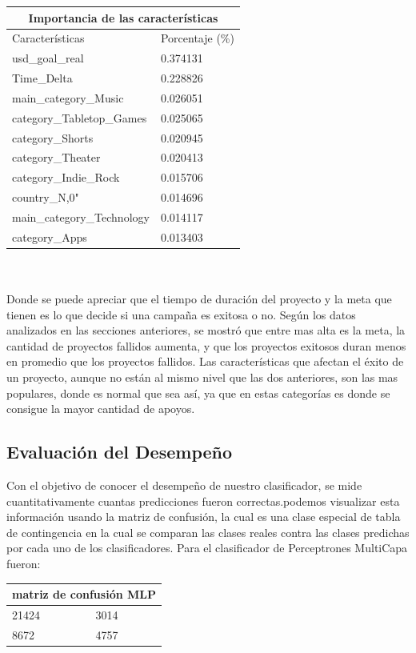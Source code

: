 \documentclass[journal]{IEEEtran}
\begin{document}
\begin{tabular}{ ||p{4cm}||p{3cm}|| }
 \hline
 \multicolumn{2}{|c|}{Importancia de las características} \\
 \hline
 Características & Porcentaje (\%) \\
 \hline
 usd\_goal\_real    & 0.374131 \\
 Time\_Delta       &  0.228826\\
 main\_category\_Music & 0.026051\\
 category\_Tabletop\_Games & 0.025065\\
 category\_Shorts &  0.020945\\
 category\_Theater &  0.020413\\
 category\_Indie\_Rock  & 0.015706\\
 country\_N,0" & 0.014696 \\
 main\_category\_Technology & 0.014117 \\
 category\_Apps & 0.013403 \\

 \hline
\end{tabular}\\
\\

Donde se puede apreciar que el tiempo de duración del proyecto y la meta que tienen es lo que decide si una campaña es exitosa o no. Según los datos analizados en las secciones anteriores, se mostró que entre mas alta es la meta, la cantidad de proyectos fallidos aumenta, y que los proyectos exitosos duran menos en promedio que los proyectos fallidos. Las características que afectan el éxito de un proyecto, aunque no están al mismo nivel que las dos anteriores, son las mas populares, donde es normal que sea así, ya que en estas categorías es donde se consigue la mayor cantidad de apoyos.
\subsection{Evaluación del Desempeño}
Con el objetivo de conocer el desempeño de nuestro clasificador, se mide cuantitativamente cuantas predicciones fueron correctas.podemos visualizar esta información usando la matriz de confusión, la cual es una clase especial de tabla de contingencia en la cual se comparan las clases reales contra las clases predichas por cada uno de los clasificadores. Para el clasificador de Perceptrones MultiCapa fueron:\\

\begin{tabular}{ ||p{3cm}||p{3cm}|| }
 \hline
 \multicolumn{2}{|c|}{matriz de confusión MLP} \\
 \hline
 21424 & 3014 \\
 \hline
 8672 & 4757 \\
 \hline
\end{tabular} \\
\end{document}
